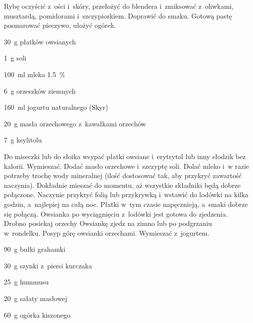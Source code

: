 \documentclass[../kucharek.tex]{subfiles}
\begin{document}
Rybę oczyścić z~ości i~skóry, przełożyć do blendera i~zmiksować z~oliwkami,
musztardą, pomidorami i~szczypiorkiem. Doprawić do smaku. Gotową pastę
posmarować pieczywo, ułożyć ogórek.


\begin{Ingred}
    \item \qty{30}{\gram} płatków owsianych
    \item \qty{1}{\gram} soli
    \item \qty{100}{\milli\litre} mleka \qty{1.5}{\percent}
    \item \qty{6}{\gram} orzeszków ziemnych
    \item \qty{160}{\milli\litre} jogurtu naturalnego (Skyr)
    \item \qty{20}{\gram} masła orzechowego z~kawałkami orzechów
    \item \qty{7}{\gram} ksylitolu
\end{Ingred}

Do miseczki lub do słoika wsypać płatki owsiane i~erytrytol lub inny słodzik
bez kalorii. Wymieszać. Dodać masło orzechowe i~szczyptę soli. Dolać mleko i~w
razie potrzeby trochę wody mineralnej (ilość dostosować tak, aby przykryć
zawartość naczynia). Dokładnie mieszać do momentu, aż wszystkie składniki będą
dobrze połączone. Naczynie przykryć folią lub przykrywką i~wstawić do lodówki
na kilka godzin, a~najlepiej na całą noc. Płatki w~tym czasie napęcznieją,
a~smaki dobrze się połączą. Owsianka po wyciągnięciu z~lodówki jest gotowa do
zjedzenia. Drobno posiekaj orzechy Owsiankę zjedz na zimno lub po podgrzaniu
w~rondelku. Posyp górę owsianki orzechami. Wymieszać z~jogurtem.


\begin{Ingred}
    \item \qty{90}{\gram} bułki grahamki
    \item \qty{30}{\gram} szynki z~piersi kurczaka
    \item \qty{25}{\gram} hummusu
    \item \qty{20}{\gram} sałaty masłowej
    \item \qty{60}{\gram} ogórka kiszonego
\end{Ingred}

\end{document}

